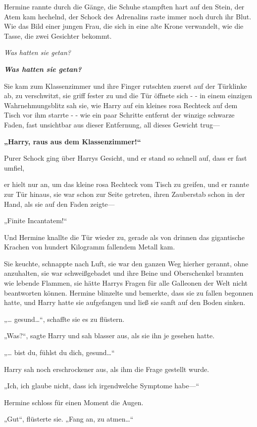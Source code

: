 {Hermine rannte durch die Gänge, die Schuhe stampften hart auf den Stein, der Atem kam hechelnd, der Schock des Adrenalins raste immer noch durch ihr Blut. Wie das Bild einer jungen Frau, die sich in eine alte Krone verwandelt, wie die Tasse, die zwei Gesichter bekommt.

\emph{Was hatten sie getan?}

\textbf{\emph{Was hatten sie getan?}}

Sie kam zum Klassenzimmer und ihre Finger rutschten zuerst auf der Türklinke ab, zu verschwitzt, sie griff fester zu und die Tür öffnete sich - - in einem einzigen Wahrnehmungsblitz sah sie, wie Harry auf ein kleines rosa Rechteck auf dem Tisch vor ihm starrte - - wie ein paar Schritte entfernt der winzige schwarze Faden, fast unsichtbar aus dieser Entfernung, all dieses Gewicht trug—

\textbf{„Harry, raus aus dem Klassenzimmer!“}

Purer Schock ging über Harrys Gesicht, und er stand so schnell auf, dass er fast umfiel,

er hielt nur an, um das kleine rosa Rechteck vom Tisch zu greifen, und er rannte zur Tür hinaus, sie war schon zur Seite getreten, ihren Zauberstab schon in der Hand, als sie auf den Faden zeigte—

„Finite Incantatem!“

Und Hermine knallte die Tür wieder zu, gerade als von drinnen das gigantische Krachen von hundert Kilogramm fallendem Metall kam.

Sie keuchte, schnappte nach Luft, sie war den ganzen Weg hierher gerannt, ohne anzuhalten, sie war schweißgebadet und ihre Beine und Oberschenkel brannten wie lebende Flammen, sie hätte Harrys Fragen für alle Galleonen der Welt nicht beantworten können. Hermine blinzelte und bemerkte, dass sie zu fallen begonnen hatte, und Harry hatte sie aufgefangen und ließ sie sanft auf den Boden sinken.

„… gesund…“, schaffte sie es zu flüstern.

„Was?“, sagte Harry und sah blasser aus, als sie ihn je gesehen hatte.

„… bist du, fühlst du dich, gesund…“

Harry sah noch erschrockener aus, als ihm die Frage gestellt wurde.

„Ich, ich glaube nicht, dass ich irgendwelche Symptome habe—“

Hermine schloss für einen Moment die Augen.

„Gut“, flüsterte sie. „Fang an, zu atmen…“

}
